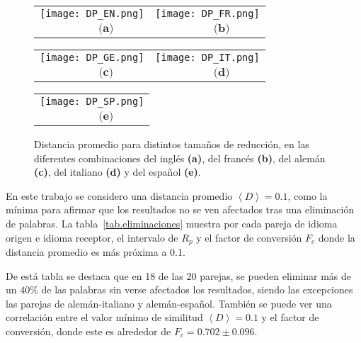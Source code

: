 \begin{figure}[t]
	\centering
	\begin{tabular}{cc}
		\texttt{[image: DP\_EN.png]} &
		\texttt{[image: DP\_FR.png]} \\
		$\,\,\,\,\,\,\,\,\,\,\,\,\,\,\, \textbf{(a)}$    & 
		$\,\,\,\,\,\,\,\,\,\,\,\,\,\,\, \textbf{(b)}$ \\
	\end{tabular}
	
	\begin{tabular}{cc}
		\texttt{[image: DP\_GE.png]} &
		\texttt{[image: DP\_IT.png]} \\
		$\,\,\,\,\,\,\,\,\,\,\,\,\,\,\, \textbf{(c)}$    & 
		$\,\,\,\,\,\,\,\,\,\,\,\,\,\,\, \textbf{(d)}$    \\
	\end{tabular}
	\begin{tabular}{c}
		\texttt{[image: DP\_SP.png]} \\
		$\,\,\,\,\,\,\,\,\,\,\,\,\,\,\, \textbf{(e)}$  \\
	\end{tabular}
	\caption{Distancia promedio para distintos tamaños de reducción, en las diferentes combinaciones del inglés \textbf{(a)}, del francés \textbf{(b)}, del alemán \textbf{(c)}, del italiano \textbf{(d)} y del español \textbf{(e)}.}
	\label{fig.DP_eliminacion}
\end{figure} 


En este trabajo se considero una distancia promedio $\left\langle D \right\rangle=0.1 $, como la mínima para afirmar que los resultados no se ven afectados tras una eliminación de palabras. La tabla~\ref{tab.eliminaciones} muestra  por cada pareja de idioma origen e idioma receptor, el intervalo de $R_{p}$  y el factor de conversión $F_{c}$ donde la distancia promedio es más próxima a 0.1.

De está tabla se destaca que en 18 de las 20 parejas, se pueden eliminar más de un $40\%$ de las palabras sin verse afectados los resultados, siendo las excepciones las parejas de alemán-italiano y alemán-español.  También se puede ver una correlación entre el valor mínimo de similitud  $\left\langle D \right\rangle=0.1 $ y el factor de conversión, donde este es alrededor de $F_{c}= 0.702 \pm 0.096$.





